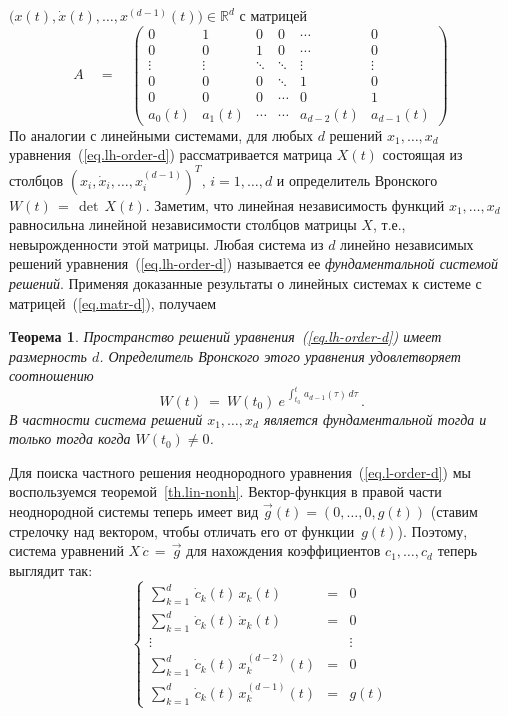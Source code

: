 \documentclass[12pt,a4paper]{article}
\newtheorem{theorem}{Теорема}
\newcommand{\re}{{\mathbb R}}
\begin{document}
\linebreak $\bigl(x(t), \dot x (t), \ldots , x^{(d -1)}(t)\bigr) \in \re^d$ с матрицей
\begin{equation}\label{eq.matr-d}
A \quad  = \quad  \left(
\begin{array}{cccccc}
0 & 1 & 0 & 0 & \cdots & 0\\
0 & 0 & 1 & 0 & \cdots & 0\\
\vdots & \vdots & \ddots & \ddots & \vdots & \vdots \\
 0 & 0 & 0 & \ddots & 1 & 0 \\
 0 & 0 & 0 & \cdots & 0  & 1\\
 a_0(t) & a_1(t) & \cdots & \cdots & a_{d-2}(t)  & a_{d-1}(t)
\end{array}
\right)
\end{equation}
По аналогии с линейными системами, для любых $d$ решений $x_1, \ldots, x_d$ уравнения~(\ref{eq.lh-order-d})
рассматривается матрица $X(t)$ состоящая из столбцов
$(x_i, \dot x_i, \ldots , x_i^{(d -1)})^T, \, i = 1, \ldots , d$ и
определитель Вронского $W(t) \, = \, \det \, X(t)$. Заметим, что линейная независимость
функций $x_1, \ldots , x_d$ равносильна линейной независимости столбцов матрицы $X$, т.е.,
невырожденности этой матрицы. Любая система из $d$ линейно независимых решений уравнения~(\ref{eq.lh-order-d})
называется ее {\em фундаментальной системой решений}. Применяя доказанные результаты о линейных системах к
системе с матрицей~(\ref{eq.matr-d}), получаем
\begin{theorem}\label{th.l-order-d}
Пространство решений   уравнения~(\ref{eq.lh-order-d}) имеет размерность $d$.
Определитель Вронского этого уравнения удовлетворяет соотношению
 $$
 \, W(t) \ = \ W(t_0) \ e^{\, \int_{t_0}^t \, a_{d-1}(\tau) \, d \tau }\, .
 $$
  В частности
 система решений $x_1, \ldots , x_d$ является фундаментальной тогда и только тогда когда $W(t_0)\ne 0$.
\end{theorem}
  Для поиска частного решения неоднородного уравнения~(\ref{eq.l-order-d}) мы воспользуемся
  теоремой~\ref{th.lin-nonh}. Вектор-функция в правой части неоднородной системы теперь имеет вид
  $\vec{g}(t) = (0, \ldots , 0, g(t))$ (ставим стрелочку над вектором, чтобы отличать его от функции~$g(t)$).
   Поэтому, система уравнений  $X \, \dot c \, = \, \vec{g}$
для нахождения коэффициентов $c_1, \ldots , c_d$ теперь выглядит так:
  \begin{equation}\label{eq.d-nonh}
\left\{
\begin{array}{lcl}
\sum_{k=1}^d \, \dot c_k(t) \, x_k(t)   & = & 0\\
\sum_{k=1}^d \, \dot c_k(t) \, \dot x_k(t)   & = & 0\\
\vdots & {} & \vdots \\
\sum_{k=1}^d \, \dot c_k(t) \,  x_k^{(d-2)}(t)   & = & 0\\
\sum_{k=1}^d \, \dot c_k(t) \,  x_k^{(d-1)}(t)   & = & g(t)
\end{array}
\right.
\end{equation}
\end{document}
